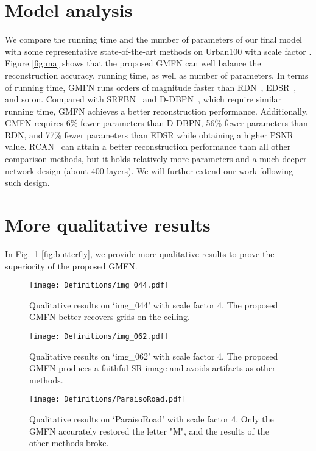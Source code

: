 \documentclass{bmvc2k}
\begin{document}
\section{Model analysis}
\label{sec:ma}
We compare the running time and the number of parameters of our final model with some representative state-of-the-art methods on Urban100 with scale factor . Figure \ref{fig:ma} shows that the proposed GMFN can well balance the reconstruction accuracy, running time, as well as number of parameters. In terms of running time, GMFN runs orders of magnitude faster than RDN~\cite{zhang2018residual}, EDSR~\cite{lim2017enhanced}, and so on. Compared with SRFBN~\cite{li2019srfbn} and D-DBPN~\cite{haris2018deep}, which require similar running time, GMFN achieves a better reconstruction performance. Additionally, GMFN requires 6\% fewer parameters than D-DBPN, 56\% fewer parameters than RDN, and 77\% fewer parameters than EDSR while obtaining a higher PSNR value. RCAN~\cite{zhang2018image} can attain a better reconstruction performance than all other comparison methods, but it holds relatively more parameters and a much deeper network design (about 400 layers). We will further extend our work following such design. 

\section{More qualitative results}
\label{sec:mqr}
In Fig.~\ref{fig:img_044}-\ref{fig:butterfly}, we provide more qualitative results to prove the superiority of the proposed GMFN. 


\begin{figure}[htbp]
	\centering
	{\texttt{[image: Definitions/img\_044.pdf]}} 
	\caption{Qualitative results on `img\_044' with scale factor 4. The proposed GMFN better recovers grids on the ceiling.}
	\label{fig:img_044}
\end{figure}

\begin{figure}[htbp]
	\centering
	{\texttt{[image: Definitions/img\_062.pdf]}} 
	\caption{Qualitative results on `img\_062' with scale factor 4. The proposed GMFN produces a faithful SR image and avoids artifacts as other methods.}
	\label{fig:img_062}
\end{figure}

\begin{figure}[htbp]
	\centering
	{\texttt{[image: Definitions/ParaisoRoad.pdf]}} 
	\caption{Qualitative results on `ParaisoRoad' with scale factor 4. Only the GMFN accurately restored the letter "M", and the results of the other methods broke.}
	\label{fig:ParaisoRoad}
\end{figure} 
\end{document}
